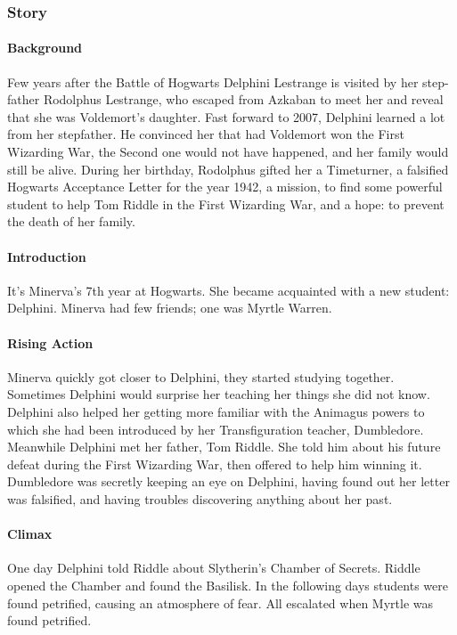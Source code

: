 \subsubsection{Story}

\paragraph{Background}
Few years after the Battle of Hogwarts Delphini Lestrange is visited by her step-father Rodolphus Lestrange, who escaped from Azkaban to meet her and reveal that she was Voldemort's daughter.
Fast forward to 2007, Delphini learned a lot from her stepfather. He convinced her that had Voldemort won the First Wizarding War, the Second one would not have happened, and her family would still be alive. During her birthday, Rodolphus gifted her a Timeturner, a falsified Hogwarts Acceptance Letter for the year 1942, a mission, to find some powerful student to help Tom Riddle in the First Wizarding War, and a hope: to prevent the death of her family. 

\paragraph{Introduction}
It's Minerva's 7th year at Hogwarts. She became acquainted with a new student: Delphini. Minerva had few friends; one was Myrtle Warren.

\paragraph{Rising Action}
Minerva quickly got closer to Delphini, they started studying together. Sometimes Delphini would surprise her teaching her things she did not know. Delphini also helped her getting more familiar with the Animagus powers to which she had been introduced by her Transfiguration teacher, Dumbledore.
Meanwhile Delphini met her father, Tom Riddle. She told him about his future defeat during the First Wizarding War, then offered to help him winning it.
Dumbledore was secretly keeping an eye on Delphini, having found out her letter was falsified, and having troubles discovering anything about her past.

\paragraph{Climax}
One day Delphini told Riddle about Slytherin's Chamber of Secrets. Riddle opened the Chamber and found the Basilisk. In the following days students were found petrified, causing an atmosphere of fear. All escalated when Myrtle was found petrified.

